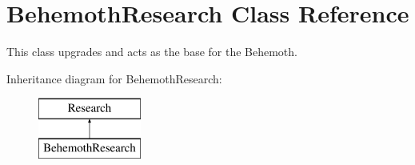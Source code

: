 \hypertarget{class_behemoth_research}{}\section{Behemoth\+Research Class Reference}
\label{class_behemoth_research}


This class upgrades and acts as the base for the Behemoth.  


Inheritance diagram for Behemoth\+Research\+:\begin{figure}[H]
\begin{center}
\leavevmode
\includegraphics[height=2.000000cm]{class_behemoth_research}
\end{center}
\end{figure}
